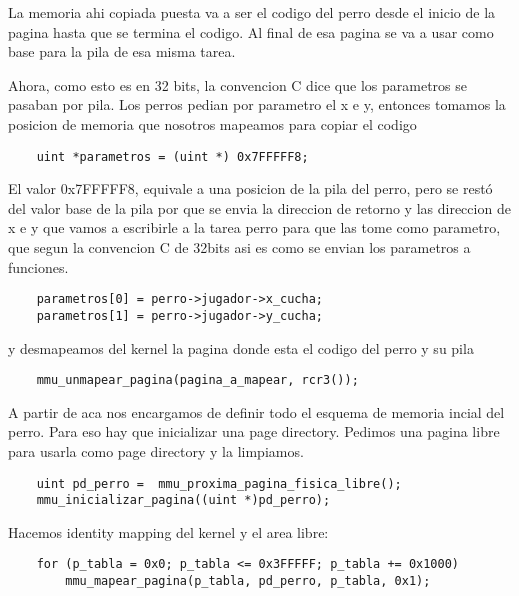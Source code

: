 La memoria ahi copiada puesta va a ser el codigo del perro desde el inicio de la pagina hasta que se termina el codigo. Al final de esa pagina se va a usar como base para la pila de esa misma tarea.

Ahora, como esto es en 32 bits, la convencion C dice que los parametros se pasaban por pila.
Los perros pedian por parametro el x e y, entonces tomamos la posicion de memoria que nosotros mapeamos para copiar el codigo
\begin{codesnippet}
\begin{verbatim}
	uint *parametros = (uint *) 0x7FFFFF8;
	    \end{verbatim}
\end{codesnippet}

El valor 0x7FFFFF8,  equivale a una posicion de la pila del perro, pero se restó del valor base de la pila por que se envia la direccion de retorno y las direccion de x e y que vamos a escribirle a la tarea perro para que las tome como parametro, que segun la convencion C de 32bits asi es como se envian los parametros a funciones.
\begin{codesnippet}
\begin{verbatim}
	parametros[0] = perro->jugador->x_cucha;
	parametros[1] = perro->jugador->y_cucha; 
    \end{verbatim}
\end{codesnippet}


y desmapeamos del kernel la pagina donde esta el codigo del perro y su pila
\begin{codesnippet}
\begin{verbatim}
    mmu_unmapear_pagina(pagina_a_mapear, rcr3());
    \end{verbatim}
\end{codesnippet}



A partir de aca nos encargamos de definir todo el esquema de memoria incial del perro.
Para eso hay que inicializar una page directory. Pedimos una pagina libre para usarla como page directory y la limpiamos.
\begin{codesnippet}
\begin{verbatim}
 	uint pd_perro =  mmu_proxima_pagina_fisica_libre();
  	mmu_inicializar_pagina((uint *)pd_perro);
    \end{verbatim}
\end{codesnippet}


Hacemos identity mapping del kernel y el area libre:
\begin{codesnippet}
\begin{verbatim}
	for (p_tabla = 0x0; p_tabla <= 0x3FFFFF; p_tabla += 0x1000)
        mmu_mapear_pagina(p_tabla, pd_perro, p_tabla, 0x1);
    \end{verbatim}
\end{codesnippet}

